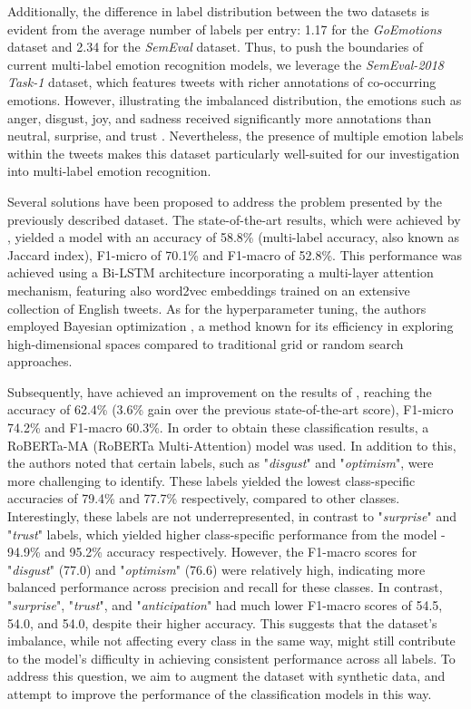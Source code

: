 \documentclass[manuscript]{clv3}
\begin{document}
Additionally, the difference in label distribution between the two datasets is evident from the average number of labels per entry: 1.17 for the \textit{GoEmotions} dataset and 2.34 for the \textit{SemEval} dataset. Thus, to push the boundaries of current multi-label emotion recognition models, we leverage the \textit{SemEval-2018 Task-1} dataset, which features tweets with richer annotations of co-occurring emotions. However, illustrating the imbalanced distribution, the emotions such as anger, disgust, joy, and sadness received significantly more annotations than neutral, surprise, and trust \cite{10.1016/j.eswa.2022.118534}. Nevertheless, the presence of multiple emotion labels within the tweets makes this dataset particularly well-suited for our investigation into multi-label emotion recognition. 

Several solutions have been proposed to address the problem presented by the previously described dataset. The state-of-the-art results, which were achieved by \citet{baziotis2018ntuaslp}, yielded a model with an accuracy of 58.8\% (multi-label accuracy, also known as Jaccard index), F1-micro of 70.1\% and F1-macro of 52.8\%. This performance was achieved using a Bi-LSTM architecture incorporating a multi-layer attention mechanism, featuring also word2vec embeddings trained on an extensive collection of English tweets. As for the hyperparameter tuning, the authors employed Bayesian optimization \cite{baziotis2018ntuaslp, 10.1016/j.eswa.2022.118534}, a method known for its efficiency in exploring high-dimensional spaces compared to traditional grid or random search approaches.

Subsequently, \citet{10.1016/j.eswa.2022.118534} have achieved an improvement on the results of \citet{baziotis2018ntuaslp}, reaching the accuracy of 62.4\% (3.6\% gain over the previous state-of-the-art score), F1-micro 74.2\% and F1-macro 60.3\%. In order to obtain these classification results, a RoBERTa-MA (RoBERTa Multi-Attention) model was used. In addition to this, the authors noted that certain labels,  such as "\textit{disgust}" and "\textit{optimism}", were more challenging to identify. These labels yielded the lowest class-specific accuracies of 79.4\% and 77.7\% respectively, compared to other classes. Interestingly, these labels are not underrepresented, in contrast to "\textit{surprise}" and "\textit{trust}" labels, which yielded higher class-specific performance from the model - 94.9\% and 95.2\% accuracy respectively. However, the F1-macro scores for "\textit{disgust}" (77.0) and "\textit{optimism}" (76.6) were relatively high, indicating more balanced performance across precision and recall for these classes. In contrast, "\textit{surprise}", "\textit{trust}", and "\textit{anticipation}" had much lower F1-macro scores of 54.5, 54.0, and 54.0, despite their higher accuracy. This suggests that the dataset's imbalance, while not affecting every class in the same way, might still contribute to the model's difficulty in achieving consistent performance across all labels. To address this question, we aim to augment the dataset with synthetic data, and attempt to improve the performance of the classification models in this way.
\end{document}
